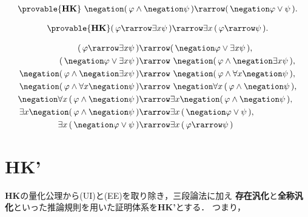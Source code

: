 	\begin{screen}
		\begin{thm}
			\begin{align}
				\provable{\mbox{{\bf HK}}}
				\ \negation (\, \varphi \wedge \negation \psi\, )
				\rarrow (\, \negation \varphi \vee \psi\, ).
			\end{align}
		\end{thm}
	\end{screen}
	
	\begin{screen}
		\begin{thm}
			\begin{align}
				\provable{\mbox{{\bf HK}}} (\, \varphi \rarrow \exists x \psi\, ) 
				\rarrow \exists x\, (\, \varphi \rarrow \psi\, ).
			\end{align}
		\end{thm}
	\end{screen}
	
	\begin{sketch}
		\begin{align}
			(\, \varphi \rarrow \exists x \psi\, ) &\rarrow 
				(\, \negation \varphi \vee \exists x \psi\, ), \\
			(\, \negation \varphi \vee \exists x \psi\, ) &\rarrow
				\ \negation (\, \varphi \wedge \negation \exists x \psi\, ), \\
			\negation (\, \varphi \wedge \negation \exists x \psi\, ) &\rarrow 
				\ \negation (\, \varphi \wedge \forall x \negation \psi\, ), \\
			\negation (\, \varphi \wedge \forall x \negation \psi\, ) &\rarrow 
				\ \negation \forall x\, (\, \varphi \wedge \negation \psi\, ), \\
			\negation \forall x\, (\, \varphi \wedge \negation \psi\, ) &\rarrow 
				\exists x \negation (\, \varphi \wedge \negation \psi\, ), \\
			\exists x \negation (\, \varphi \wedge \negation \psi\, ) &\rarrow 
				\exists x\, (\, \negation \varphi \vee \psi\, ), \\
			\exists x\, (\, \negation \varphi \vee \psi\, ) &\rarrow 
				\exists x\, (\, \varphi \rarrow \psi\, )
		\end{align}
	\end{sketch}
	
\section{{\bf HK'}}
	{\bf HK}の量化公理から(UI)と(EE)を取り除き，三段論法に加え
	{\bf 存在汎化}と{\bf 全称汎化}といった推論規則を用いた証明体系を{\bf HK'}とする．
	つまり，
	
